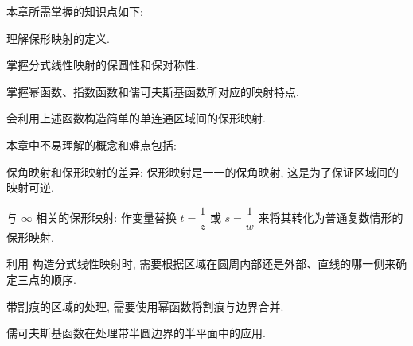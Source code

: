 
本章所需掌握的知识点如下:
\begin{enuma}
  \item 理解保形映射的定义.
  \item 掌握分式线性映射的保圆性和保对称性.
  \item 掌握幂函数、指数函数和儒可夫斯基函数所对应的映射特点.
  \item 会利用上述函数构造简单的单连通区域间的保形映射.
\end{enuma}

本章中不易理解的概念和难点包括:
\begin{enuma}
  \item 保角映射和保形映射的差异: 保形映射是一一的保角映射, 这是为了保证区域间的映射可逆.
  \item 与 $\infty$ 相关的保形映射: 作变量替换 $t=\dfrac1z$ 或 $s=\dfrac1w$ 来将其转化为普通复数情形的保形映射.
  \item 利用 构造分式线性映射时, 需要根据区域在圆周内部还是外部、直线的哪一侧来确定三点的顺序.
  \item 带割痕的区域的处理, 需要使用幂函数将割痕与边界合并.
  \item 儒可夫斯基函数在处理带半圆边界的半平面中的应用.
\end{enuma}


